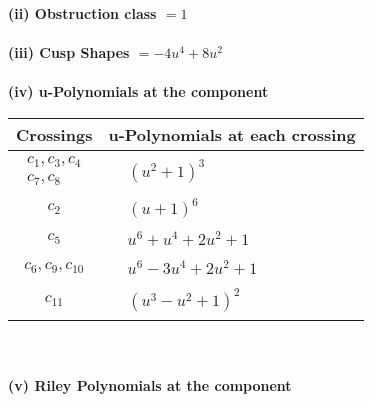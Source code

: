 \documentclass[1p]{elsarticle_modified}
\theoremstyle{definition}
\begin{document}
\flushleft \textbf{(ii) Obstruction class $= 1$}\\~\\
\flushleft \textbf{(iii) Cusp Shapes $= -4 u^4+8 u^2$}\\~\\
\newpage\renewcommand{\arraystretch}{1}
\flushleft \textbf{(iv) u-Polynomials at the component}\newline \\
\begin{tabular}{m{50pt}|m{274pt}}
Crossings & \hspace{64pt}u-Polynomials at each crossing \\
\hline $$\begin{aligned}c_{1},c_{3},c_{4}\\c_{7},c_{8}\end{aligned}$$&$\begin{aligned}
&(u^2+1)^3
\end{aligned}$\\
\hline $$\begin{aligned}c_{2}\end{aligned}$$&$\begin{aligned}
&(u+1)^6
\end{aligned}$\\
\hline $$\begin{aligned}c_{5}\end{aligned}$$&$\begin{aligned}
&u^6+u^4+2 u^2+1
\end{aligned}$\\
\hline $$\begin{aligned}c_{6},c_{9},c_{10}\end{aligned}$$&$\begin{aligned}
&u^6-3 u^4+2 u^2+1
\end{aligned}$\\
\hline $$\begin{aligned}c_{11}\end{aligned}$$&$\begin{aligned}
&(u^3- u^2+1)^2
\end{aligned}$\\
\hline
\end{tabular}\\~\\
\newpage\renewcommand{\arraystretch}{1}
\flushleft \textbf{(v) Riley Polynomials at the component}\newline \\
\end{document}
